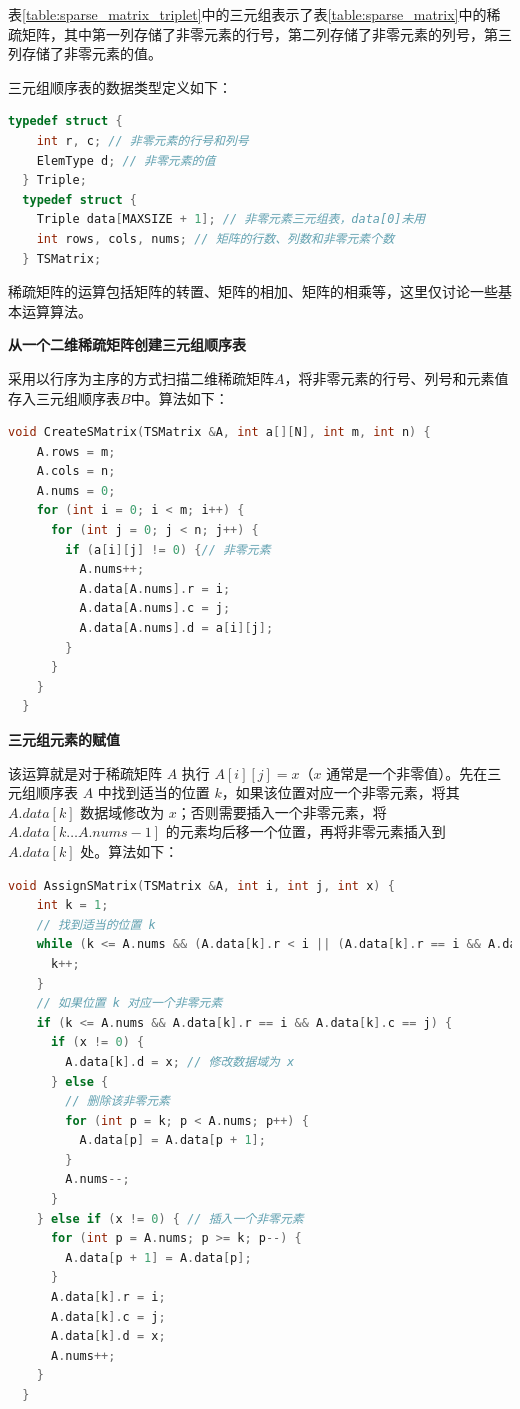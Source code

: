 \documentclass[lang=cn,newtx,10pt,scheme=chinese]{elegantbook}
\begin{document}
表\ref{table:sparse_matrix_triplet}中的三元组表示了表\ref{table:sparse_matrix}中的稀疏矩阵，其中第一列存储了非零元素的行号，第二列存储了非零元素的列号，第三列存储了非零元素的值。

三元组顺序表的数据类型定义如下：

\begin{lstlisting}[language=C++, caption={三元组顺序表的数据类型定义}]
  typedef struct {
    int r, c; // 非零元素的行号和列号
    ElemType d; // 非零元素的值
  } Triple;
  typedef struct {
    Triple data[MAXSIZE + 1]; // 非零元素三元组表，data[0]未用
    int rows, cols, nums; // 矩阵的行数、列数和非零元素个数
  } TSMatrix;
\end{lstlisting}


稀疏矩阵的运算包括矩阵的转置、矩阵的相加、矩阵的相乘等，这里仅讨论一些基本运算算法。

\textbf{从一个二维稀疏矩阵创建三元组顺序表}

采用以行序为主序的方式扫描二维稀疏矩阵$A$，将非零元素的行号、列号和元素值存入三元组顺序表$B$中。算法如下：

\begin{lstlisting}[language=C++, caption={从一个二维稀疏矩阵创建三元组顺序表}]
  void CreateSMatrix(TSMatrix &A, int a[][N], int m, int n) {
    A.rows = m;
    A.cols = n;
    A.nums = 0;
    for (int i = 0; i < m; i++) {
      for (int j = 0; j < n; j++) {
        if (a[i][j] != 0) {// 非零元素
          A.nums++;
          A.data[A.nums].r = i;
          A.data[A.nums].c = j;
          A.data[A.nums].d = a[i][j];
        }
      }
    }
  }
\end{lstlisting}


\textbf{三元组元素的赋值}

该运算就是对于稀疏矩阵 $A$ 执行 $A[i][j] = x$（$x$ 通常是一个非零值）。先在三元组顺序表 $A$ 中找到适当的位置 $k$，如果该位置对应一个非零元素，将其 $A.data[k]$ 数据域修改为 $x$；否则需要插入一个非零元素，将 $A.data[k \dots A.nums-1]$ 的元素均后移一个位置，再将非零元素插入到 $A.data[k]$ 处。算法如下：

\begin{lstlisting}[language=C++, caption={稀疏矩阵三元组顺序表的赋值操作}]
  void AssignSMatrix(TSMatrix &A, int i, int j, int x) {
    int k = 1;
    // 找到适当的位置 k
    while (k <= A.nums && (A.data[k].r < i || (A.data[k].r == i && A.data[k].c < j))) {
      k++;
    }
    // 如果位置 k 对应一个非零元素
    if (k <= A.nums && A.data[k].r == i && A.data[k].c == j) {
      if (x != 0) {
        A.data[k].d = x; // 修改数据域为 x
      } else {
        // 删除该非零元素
        for (int p = k; p < A.nums; p++) {
          A.data[p] = A.data[p + 1];
        }
        A.nums--;
      }
    } else if (x != 0) { // 插入一个非零元素
      for (int p = A.nums; p >= k; p--) {
        A.data[p + 1] = A.data[p];
      }
      A.data[k].r = i;
      A.data[k].c = j;
      A.data[k].d = x;
      A.nums++;
    }
  }
\end{lstlisting}
\end{document}
